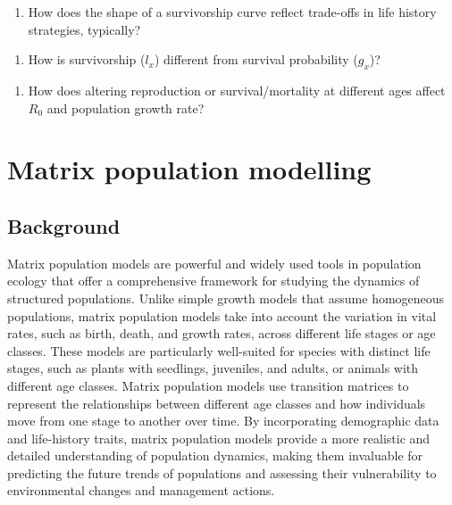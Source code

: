 \documentclass[
  a4paper]{book}
\providecommand{\tightlist}{%
  \setlength{\itemsep}{0pt}\setlength{\parskip}{0pt}}
\begin{document}
\begin{enumerate}
\def\labelenumi{\arabic{enumi}.}
\setcounter{enumi}{2}
\tightlist
\item
  How does the shape of a survivorship curve reflect trade-offs in life history strategies, typically?
\end{enumerate}

\begin{enumerate}
\def\labelenumi{\arabic{enumi}.}
\setcounter{enumi}{3}
\tightlist
\item
  How is survivorship (\(l_x\)) different from survival probability (\(g_x\))?
\end{enumerate}

\begin{enumerate}
\def\labelenumi{\arabic{enumi}.}
\setcounter{enumi}{4}
\tightlist
\item
  How does altering reproduction or survival/mortality at different ages affect \(R_0\) and population growth rate?
\end{enumerate}

\chapter{Matrix population modelling}\label{matrix-population-modelling}

\section{Background}\label{background-8}

Matrix population models are powerful and widely used tools in population ecology that offer a comprehensive framework for studying the dynamics of structured populations. Unlike simple growth models that assume homogeneous populations, matrix population models take into account the variation in vital rates, such as birth, death, and growth rates, across different life stages or age classes. These models are particularly well-suited for species with distinct life stages, such as plants with seedlings, juveniles, and adults, or animals with different age classes. Matrix population models use transition matrices to represent the relationships between different age classes and how individuals move from one stage to another over time. By incorporating demographic data and life-history traits, matrix population models provide a more realistic and detailed understanding of population dynamics, making them invaluable for predicting the future trends of populations and assessing their vulnerability to environmental changes and management actions.
\end{document}
